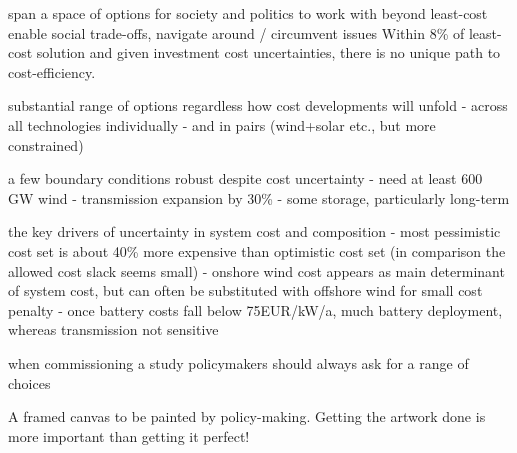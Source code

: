 
span a space of options for society and politics to work with beyond least-cost
enable social trade-offs, navigate around / circumvent issues
Within 8\% of least-cost solution and given investment cost uncertainties,
there is no unique path to cost-efficiency.

substantial range of options regardless how cost developments will unfold
- across all technologies individually
- and in pairs (wind+solar etc., but more constrained)

a few boundary conditions robust despite cost uncertainty
- need at least 600 GW wind
- transmission expansion by 30\%
- some storage, particularly long-term

the key drivers of uncertainty in system cost and composition
- most pessimistic cost set is about 40\% more expensive than optimistic cost set (in comparison the allowed cost slack seems small)
- onshore wind cost appears as main determinant of system cost, but can often be substituted with offshore wind for small cost penalty
- once battery costs fall below 75EUR/kW/a, much battery deployment, whereas transmission not sensitive

when commissioning a study policymakers should always ask for a range of choices

A framed canvas to be painted by policy-making.
Getting the artwork done is more important than getting it perfect!
